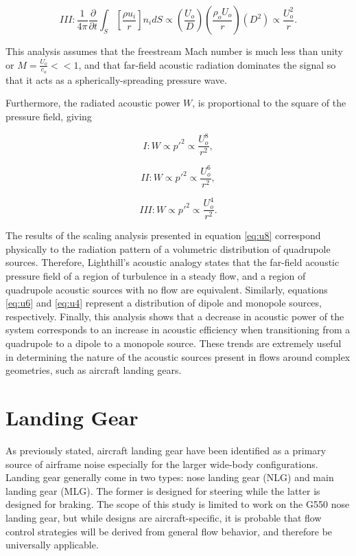 \begin{equation}
III : \frac{1}{4\pi} \frac{\partial}{\partial t} \int_S \left[ \frac{\rho u_i}{r} \right] n_i dS \propto \left( \frac{U_o}{D} \right) \left( \frac{\rho_o U_o}{r} \right) \left( D^2 \right) \propto \frac{U_o^2}{r}.
\end{equation}

This analysis assumes that the freestream Mach number is much less than unity or $M = \frac{U_o}{c_o} << 1$, and that far-field acoustic radiation dominates the signal so that it acts as a spherically-spreading pressure wave. 

Furthermore, the radiated acoustic power $W$, is proportional to the square of the pressure field, giving

\begin{equation} \label{eq:u8}
I : W \propto p'^2 \propto \frac{U_o^8}{r^2},
\end{equation}

\begin{equation} \label{eq:u6}
II : W \propto p'^2 \propto \frac{U_o^6}{r^2},
\end{equation}

\begin{equation} \label{eq:u4}
III : W \propto p'^2 \propto \frac{U_o^4}{r^2}.
\end{equation}

The results of the scaling analysis presented in equation \ref{eq:u8} correspond physically to the radiation pattern of a volumetric distribution of quadrupole sources. Therefore, Lighthill's acoustic analogy states that the far-field acoustic pressure field of a region of turbulence in a steady flow, and  a region of quadrupole acoustic sources with no flow are equivalent. Similarly, equations \ref{eq:u6} and \ref{eq:u4} represent a distribution of dipole and monopole sources, respectively. Finally, this analysis shows that a decrease in acoustic power of the system corresponds to an increase in acoustic efficiency when transitioning from a quadrupole to a dipole to a monopole source. These trends are extremely useful in determining the nature of the acoustic sources present in flows around complex geometries, such as aircraft landing gears.

\section{Landing Gear}
As previously stated, aircraft landing gear have been identified as a primary source of airframe noise especially for the larger wide-body configurations.
Landing gear generally come in two types: nose landing gear (NLG) and main landing gear (MLG). The former is designed for steering while the latter is designed for braking. 
The scope of this study is limited to work on the G550 nose landing gear, but while designs are aircraft-specific, it is probable that flow control strategies will be derived from general flow behavior, and therefore be universally applicable.

